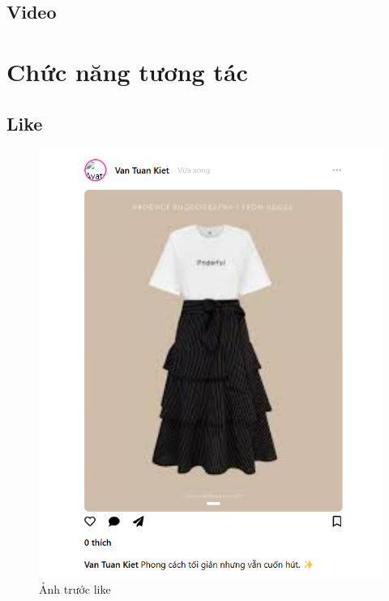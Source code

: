 \FloatBarrier %

\subsection{Video}

\section{Chức năng tương tác}
\subsection{Like}
\begin{figure}[H]
    \centering
    \includegraphics[width=1\textwidth]{img/instagram/bai_viet_hinh_anh_2.png}
    \caption{Ảnh trước like}
\end{figure}

\FloatBarrier %


